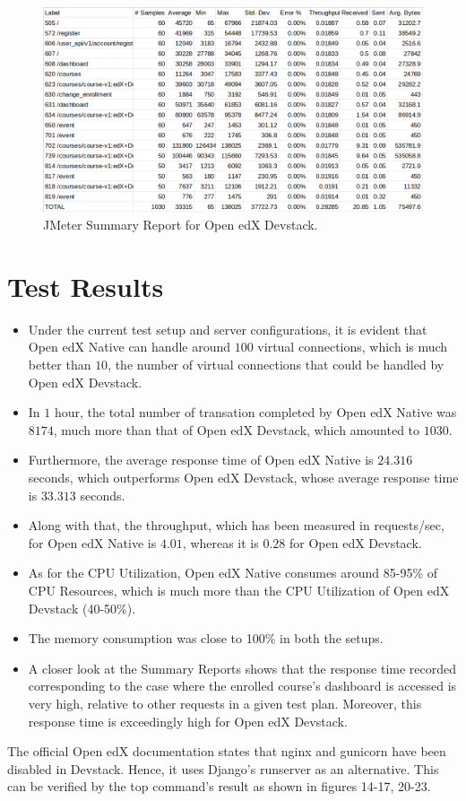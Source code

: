 \documentclass[12pt]{report}
\begin{document}
\begin{figure}[h!]
	\centering
	\includegraphics[width=\textwidth,height=\textheight,keepaspectratio]{intro/4.png}
	\caption{JMeter Summary Report for Open edX Devstack.}
\end{figure}
\clearpage
\section{Test Results} 
\begin{itemize}
	\item Under the current test setup and server configurations, it is evident that Open edX Native can handle around $100$ virtual connections, which is much better than $10$, the number of virtual connections that could be handled by Open edX Devstack.
	\item In $1$ hour, the total number of transation completed by Open edX Native was $8174$, much more than that of Open edX Devstack, which amounted to $1030$.
	\item Furthermore, the average response time of Open edX Native is $24.316$ seconds, which outperforms Open edX Devstack, whose average response time is $33.313$ seconds.
	\item Along with that, the throughput, which has been measured in requests/sec, for Open edX Native is $4.01$, whereas it is $0.28$ for Open edX Devstack.
	\item As for the CPU Utilization, Open edX Native consumes around 85-95\% of CPU Resources, which is much more than the CPU Utilization of Open edX Devstack (40-50\%).
	\item The memory consumption was close to 100\% in both the setups.
	\item A closer look at the Summary Reports shows that the response time recorded corresponding to the case where the enrolled course's dashboard is accessed is very high, relative to other requests in a given test plan. Moreover, this response time is exceedingly high for Open edX Devstack.
\end{itemize}

\par
The official Open edX documentation states that nginx and gunicorn have been disabled in Devstack. Hence, it uses Django's runserver as an alternative. This can be verified by the top command's result as shown in figures 14-17, 20-23.




\end{document}
